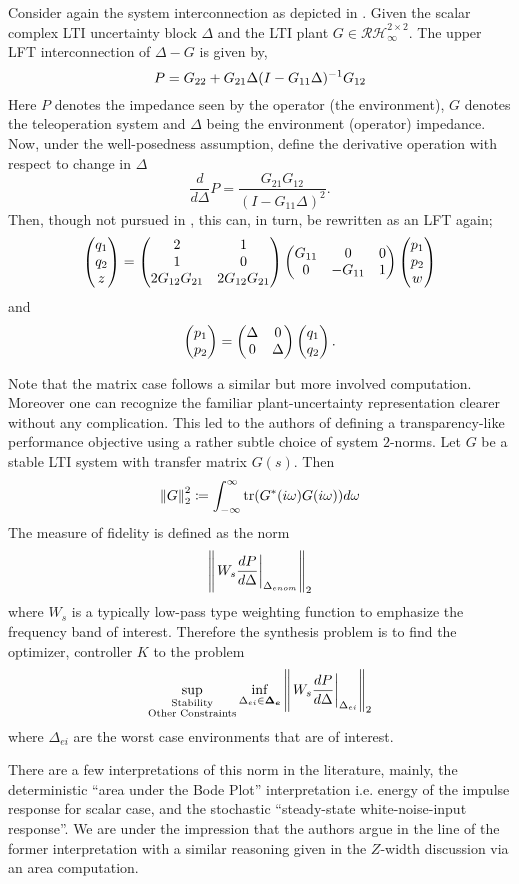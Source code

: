 Consider again the system interconnection as depicted in . Given the scalar complex LTI uncertainty block 
$\Delta$ and the LTI plant $G\in\mathcal{RH}_\infty^{2\times 2}$. The upper LFT interconnection of $\Delta-G$ is given by, 
\[
P = G_{22}+G_{21}\Delta(I-G_{11}\Delta)^{-1}G_{12}
\]
Here $P$ denotes the impedance seen by the operator (the environment), $G$ denotes the teleoperation system and $\Delta$ being the 
environment (operator) impedance. Now, under the well-posedness assumption, define the derivative operation with respect to change in $\Delta$
\[
\frac{d}{d\Delta} P = \frac{G_{21}G_{12}}{(I-G_{11}\Delta)^2}.
\]
Then, though not pursued in \cite{cavusoglu}, this can, in turn, be rewritten as an LFT again;
\[
\begin{pmatrix}q_1\\q_2\\z\end{pmatrix} = \begin{pmatrix}2&1\\1&0\\2G_{12}G_{21}&2G_{12}G_{21}\end{pmatrix}\begin{pmatrix}G_{11}&0&0\\0&-G_{11}&1\end{pmatrix} \begin{pmatrix}p_1\\p_2\\w\end{pmatrix}
\]
and 
\[
\begin{pmatrix}p_1\\p_2\end{pmatrix} = \begin{pmatrix}\Delta &0\\0 &\Delta\end{pmatrix}\begin{pmatrix}q_1\\q_2\end{pmatrix}.
\]

Note that the matrix case follows a similar but more involved computation. Moreover one can recognize the familiar
plant-uncertainty representation clearer without any complication. This led to the authors of \cite{cavusoglu} 
defining a transparency-like performance objective using a rather subtle choice of system $2$-norms. Let $G$ be a 
stable LTI system with transfer matrix $G(s)$. Then 
\[
\displaystyle \left\| G \right\|_2^2 \coloneqq \int_{-\infty}^\infty{\operatorname{tr}(G^*(i\omega)G(i\omega))}d\omega
\] 
The measure of fidelity is defined as the norm
\[
\displaystyle \left\| \left.W_s\frac{dP}{d\Delta}\right|_{\Delta_{enom}} \right\|_2
\]
where $W_s$ is a typically low-pass type weighting function to emphasize the frequency band of interest. Therefore
the synthesis problem is to find the optimizer, controller $K$ to the problem
\[
\sup_{\substack{\text{Stability}\\\text{Other Constraints}}}\inf_{\Delta_{ei}\in\bm{\Delta_e}}
\displaystyle \left\| \left.W_s\frac{dP}{d\Delta}\right|_{\Delta_{ei}} \right\|_2
\]
where $\Delta_{ei}$ are the worst case environments that are of interest.


There are a few interpretations of this norm in the literature, mainly, the deterministic \enquote{area under the Bode
Plot} interpretation i.e. energy of the impulse response for scalar case, and the stochastic \enquote{steady-state 
white-noise-input response}. We are under the impression that the authors argue in the line of the former interpretation
with a similar reasoning given in the $Z$-width discussion via an area computation. 



